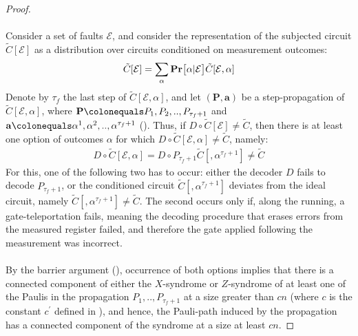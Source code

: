 \begin{proof}
    \paragraph{} 
    Consider a set of faults $\mathcal{E}$, and consider the representation of the subjected circuit $\tilde{C}[\mathcal{E}]$ as a distribution over circuits conditioned on measurement outcomes:
    \begin{equation*}
      \begin{split}
        \tilde{C}[\mathcal{E}] = \sum_{\alpha} \mathbf{Pr} \big[ \alpha | \mathcal{E}  \big]\tilde{C}[\mathcal{E}, \alpha] 
      \end{split}
    \end{equation*}
    Denote by $\tau_{f}$ the last step of $\tilde{C}[\mathcal{E},\alpha]$, and let $(\mathbf{P},\mathbf{a}) $ be a step-propagation of $\tilde{C}[\mathcal{E},\alpha]$, where $\mathbf{P} \colonequals  P_{1},P_{2},..,P_{\tau_{f}+1}$ and $\mathbf{a} \colonequals \alpha^{1}, \alpha^{2},..,\alpha^{\tau_{f}+1}$ (). Thus, if $D \circ \tilde{C}[\mathcal{E}] \neq \tilde{C}$, then there is at least one option of outcomes $\alpha$ for which $D \circ \tilde{C}[\mathcal{E},\alpha] \neq \tilde{C}$, namely: 
    \begin{equation*}
      \begin{split}
        D \circ \tilde{C}[\mathcal{E},\alpha] = D\circ P_{\tau_{f}+1} \tilde{C}[,\alpha^{\tau_{f}+1}]  \neq \tilde{C}
      \end{split}
    \end{equation*} 
    For this, one of the following two has to occur: either the decoder $D$ fails to decode $P_{\tau_{f}+1}$, or the conditioned circuit $\tilde{C}[,\alpha^{\tau_{f}+1}]$ deviates from the ideal circuit, namely $\tilde{C}[,\alpha^{\tau_{f}+1}] \neq \tilde{C}$. The second occurs only if, along the running, a gate-teleportation fails, meaning the decoding procedure that erases errors from the measured register failed, and therefore the gate applied following the measurement was incorrect. 

    \paragraph{} 

By the barrier argument (), occurrence of both options implies that there is a connected component of either the $X$-syndrome or $Z$-syndrome of at least one of the Paulis in the propagation $P_{1},..,P_{\tau_{f}+1}$ at a size greater than $cn$ (where $c$ is the constant $c^{\prime}$ defined in ), and hence, the Pauli-path induced by the propagation has a connected component of the syndrome at a size at least $cn$.


\end{proof}
